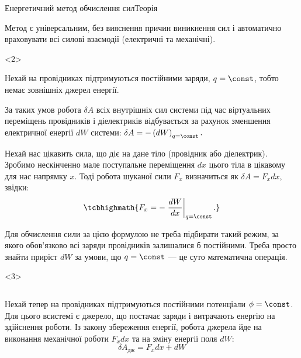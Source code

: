 \documentclass[onlytextwidth]{beamer}
\begin{document}
\begin{frame}{Енергетичний метод обчислення сил}{Теорія}
\begin{onlyenv}
\begin{block}{}
			Метод є універсальним, без вияснення причин виникнення сил і автоматично враховувати всі
			силові взаємодії (електричні та механічні).
		\end{block}
	\end{onlyenv}
	\begin{onlyenv}
		\begin{block}{}\justifying
			Нехай на провідниках підтримуються постійними заряди, $q = \const$, тобто немає зовнішніх
			джерел енергії.
		\end{block}
		\begin{block}{}\justifying
			За таких умов робота $\delta A$ всіх внутрішніх сил системи під час віртуальних переміщень
			провідників і діелектриків відбувається за рахунок зменшення електричної енергії $dW$ системи:
			$
				\delta A = - \left( dW\right)_{q=\const}.
			$
		\end{block}
		\begin{block}{}\small\justifying
			Нехай нас цікавить сила, що діє на дане тіло (провідник або діелектрик). Зробимо нескінченно
			мале поступальне переміщення $dx$ цього тіла в цікавому для нас напрямку $x$. Тоді робота
			шуканої сили $F_x$ визначиться як $\delta A = F_x dx$, звідки:
			\begin{equation*}
				\tcbhighmath{F_x = -\left.\frac{dW}{dx}\right|_{q=\const}.}
			\end{equation*}
		\end{block}
		\begin{alertblock}{}\small\justifying
			Для обчислення сили за цією формулою не треба підбирати такий режим, за якого обов'язково всі
			заряди провідників залишалися б постійними. Треба просто знайти приріст $dW$ за умови, що $q =
				\const$ --- це суто математична операція.
		\end{alertblock}
	\end{onlyenv}
	\begin{onlyenv}
		\begin{columns}
			\begin{column}{0.7\linewidth}
				\begin{block}{}\justifying
					Нехай тепер на провідниках підтримуються постійними потенціали $\phi=\const$.
					Для цього всистемі є \alert{джерело, що постачає заряди і витрачають енергію на
						здійснення роботи}. Із закону збереження енергії, робота джерела йде на
					виконання механічної роботи $F_x dx$ та на зміну енергії поля $dW$:
					\begin{equation*}
						\delta A_\text{дж} = F_x dx + dW

\end{equation*}
\end{block}
\end{column}
\end{columns}
\end{onlyenv}
\end{frame}
\end{document}
